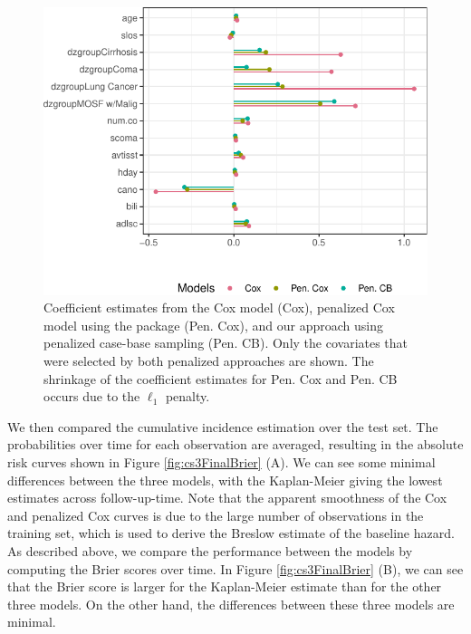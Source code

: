 \documentclass[
]{jss}
\begin{document}
\begin{CodeChunk}
\begin{figure}[ht]

{\centering \includegraphics[width=\textwidth,keepaspectratio=true]{../figures/coefplots-1} 

}

\caption{\label{fig:cs3lolliPlot} Coefficient estimates from the Cox model (Cox), penalized Cox model using the  package (Pen. Cox), and our approach using penalized case-base sampling (Pen. CB). Only the covariates that were selected by both penalized approaches are shown. The shrinkage of the coefficient estimates for Pen. Cox and Pen. CB occurs due to the $\ell_1$ penalty.}\label{fig:coefplots}
\end{figure}
\end{CodeChunk}

We then compared the cumulative incidence estimation over the test set.
The probabilities over time for each observation are averaged, resulting
in the absolute risk curves shown in Figure \ref{fig:cs3FinalBrier} (A).
We can see some minimal differences between the three models, with the
Kaplan-Meier giving the lowest estimates across follow-up-time. Note
that the apparent smoothness of the Cox and penalized Cox curves is due
to the large number of observations in the training set, which is used
to derive the Breslow estimate of the baseline hazard. As described
above, we compare the performance between the models by computing the
Brier scores over time. In Figure \ref{fig:cs3FinalBrier} (B), we can
see that the Brier score is larger for the Kaplan-Meier estimate than
for the other three models. On the other hand, the differences between
these three models are minimal.
\end{document}

